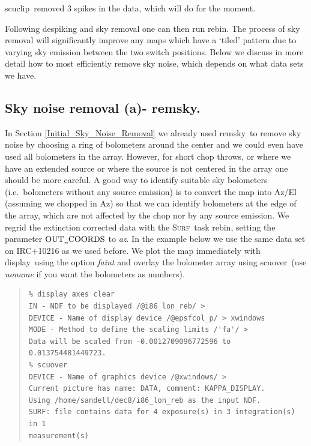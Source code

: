 \documentclass[twoside,11pt]{article}
\newenvironment{myquote}{\begin{quote}\begin{small}}{\end{small}\end{quote}}
\newcommand{\surf}{\xref{\textsc{Surf}}{sun216}{}}
\newcommand{\task}[1]{\textsf{#1}}
\newcommand{\rebin}{\xref{\task{rebin}}{sun216}{REBIN}}
\newcommand{\remsky}{\xref{\task{remsky}}{sun216}{REMSKY}}
\newcommand{\scuover}{\xref{\task{scuover}}{sun216}{SCUOVER}}
\newcommand{\scuclip}{\xref{\task{scuclip}}{sun216}{SCUCLIP}}
\newcommand{\display}{\xref{\task{display}}{sun95}{DISPLAY}}
\newcommand{\xref}[3]{#1}
\newcommand{\xlabel}[1]{}
\renewcommand{\_}{\texttt{\symbol{95}}}
\begin{document}
\scuclip\ removed 3 spikes in the data, which will do for the moment.



Following despiking and sky removal one can then run \rebin.  The
process of sky removal will significantly improve any maps which have
a `tiled' pattern due to varying sky emission between the two switch
positions.  Below we discuss in more detail how to most efficiently
remove sky noise, which depends on what data sets we have.

\subsection{\xlabel{Sky_Noise_Removal_remsky}Sky noise removal (a)-
\remsky.}

In Section \ref{Initial_Sky_Noise_Removal} we already used \remsky\ to
remove sky noise by choosing a ring of bolometers around the center
and we could even have used all bolometers in the array.  However, for
short chop throws, or where we have an extended source or where the
source is not centered in the array one should be more careful.  A
good way to identify suitable sky bolometers (i.e.\ bolometers without
any source emission) is to convert the map into Az/El (assuming we
chopped in Az) so that we can identify bolometers at the edge of the
array, which are not affected by the chop nor by any source emission. 
We regrid the extinction corrected data with the \surf\ task
\rebin, setting the parameter $\rm OUT\_COORDS$ to {\it az}.  In the
example below we use the same data set on IRC$+$10216 as we used
before.  We plot the map immediately with \display\ using the option
{\it faint} and overlay the bolometer array using \scuover\ (use {\it
noname} if you want the bolometers as numbers).


\begin{myquote}
\begin{verbatim}
% display axes clear
IN - NDF to be displayed /@i86_lon_reb/ > 
DEVICE - Name of display device /@epsfcol_p/ > xwindows
MODE - Method to define the scaling limits /'fa'/ > 
Data will be scaled from -0.0012709096772596 to 0.013754481449723.
% scuover
DEVICE - Name of graphics device /@xwindows/ > 
Current picture has name: DATA, comment: KAPPA_DISPLAY.
Using /home/sandell/dec8/i86_lon_reb as the input NDF.
SURF: file contains data for 4 exposure(s) in 3 integration(s) in 1
measurement(s)
\end{verbatim}
\end{myquote}
\end{document}
